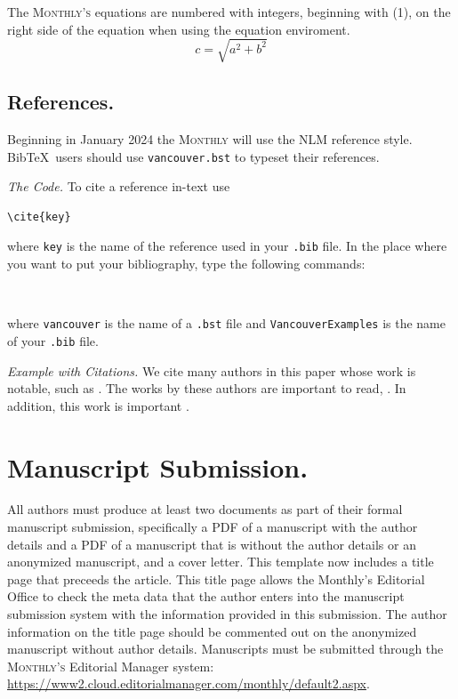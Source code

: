 \documentclass{article}
\theoremstyle{theorem}
\theoremstyle{definition}
\begin{document}
The \textsc{Monthly's} equations are numbered with integers, beginning with (1), on the right side of the equation when using the equation enviroment. 
\begin{equation}
c = \sqrt{a^{2} + b^{2}}
\end{equation}

\subsection{References.}
	Beginning in January 2024 the \textsc{Monthly} will use the NLM reference style. Bib\TeX\ users should use \texttt{vancouver.bst} to typeset their references.

\smallskip

{\it The Code.}  To cite a reference in-text use
\begin{verbatim}
\cite{key}
\end{verbatim}
where \texttt{key} is the name of the reference used in your \texttt{.bib} file. In the place where you want to put your bibliography, type the following commands:

\begin{verbatim}


\end{verbatim}
where \texttt{vancouver} is the name of a \texttt{.bst} file and \texttt{VancouverExamples} is the name of your \texttt{.bib} file.

\smallskip

{\it Example with Citations.}   We cite many authors in this paper whose work is notable, such as \cite{american, proofs, graphs, Helmer, euler, lawrence, compendium}. The works by these authors are important to read, \cite{BNV07, CW11, CCZ21}.
In addition, this work is important \cite{CCSW19}.


\section{Manuscript Submission.}\label{submit}
All authors must produce at least two documents as part of their formal manuscript submission, specifically a PDF of a manuscript with the author details and a PDF of a manuscript that is without the author details or an anonymized manuscript, and a cover letter. This template now includes a title page that preceeds the article.  This title page allows the Monthly's Editorial Office to check the meta data that the author enters into the manuscript submission system with the information provided in this submission. The author information on the title page should be commented out on the anonymized manuscript without author details. Manuscripts must be submitted through the \textsc{Monthly's} Editorial Manager system: \url{https://www2.cloud.editorialmanager.com/monthly/default2.aspx}.
\end{document}

